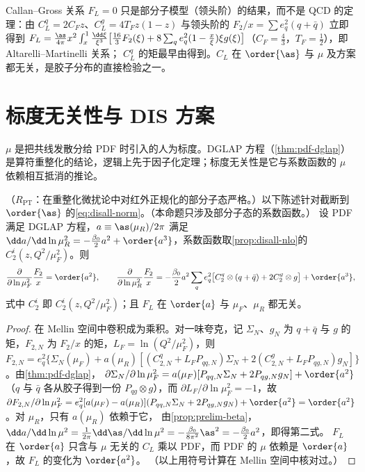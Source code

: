 \noindent
Callan--Gross 关系 $F_L=0$ 只是部分子模型（领头阶）的结果，而不是 QCD 的定理：由 $C_L^q=2C_Fz$、$C_L^g=4T_Fz(1-z)$ 与领头阶的 $F_2/x=\sum e_q^2(q+\bar q)$ 立即得到
$F_L=\frac{\as}{4\pi}x^2\int_x^1\frac{\dd\xi}{\xi^3}\big[\frac{16}3F_2(\xi)+8\sum_qe_q^2(1-\frac x\xi)\xi g(\xi)\big]$（$C_F=\frac43$，$T_F=\frac12$），即 Altarelli--Martinelli 关系\cite{AltarelliMartinelli1978}；
$C_L^q$ 的矩最早由\cite{Zee:1974du}得到。$C_L$ 在 $\order{\as}$ 与 $\mu$ 及方案都无关，是胶子分布的直接检验之一。
\section{标度无关性与 DIS 方案}\label{sec:disall-scale}

$\mu$ 是把共线发散分给 PDF 时引入的人为标度。DGLAP 方程（\cref{thm:pdf-dglap}）是算符重整化的结论，逻辑上先于因子化定理；标度无关性是它与系数函数的 $\mu$ 依赖相互抵消的推论。

\begin{proposition}\label{prop:disall-scale}
（$R_{\mathrm{PT}}$：在重整化微扰论中对红外正规化的部分子态严格。）以下陈述针对截断到 $\order{\as}$ 的\cref{eq:disall-norm}。（本命题只涉及部分子态的系数函数。）
设 PDF 满足 DGLAP 方程，$a\equiv\as(\mu_R)/2\pi$ 满足 $\dd a/\dd\ln\mu_R^2=-\frac{\beta_0}2a^2+\order{a^3}$，系数函数取\cref{prop:disall-nlo}的 $C_2^i(z,Q^2/\mu_F^2)$。则
\begin{equation}\label{eq:disall-scale}
\frac{\partial}{\partial\ln\mu_F^2}\frac{F_2}x=\order{a^2},\qquad
\frac{\partial}{\partial\ln\mu_R^2}\frac{F_2}x=-\frac{\beta_0}2a^2\sum_qe_q^2\big[C_2^q\otimes(q+\bar q)+2C_2^g\otimes g\big]+\order{a^3},   %
\end{equation}
式中 $C_2^i$ 即 $C_2^i(z,Q^2/\mu_F^2)$；且 $F_L$ 在 $\order{a}$ 与 $\mu_F$、$\mu_R$ 都无关。
\end{proposition}

\begin{proof}
在 Mellin 空间中卷积成为乘积。对一味夸克，记 $\Sigma_N$、$g_N$ 为 $q+\bar q$ 与 $g$ 的矩，$F_{2,N}$ 为 $F_2/x$ 的矩，$L_F=\ln(Q^2/\mu_F^2)$，则
$F_{2,N}=e_q^2\{\Sigma_N(\mu_F)+a(\mu_R)[(C^q_{2,N}+L_FP_{qq,N})\Sigma_N+2(C^g_{2,N}+L_FP_{qg,N})g_N]\}$。由\cref{thm:pdf-dglap}，
$\partial\Sigma_N/\partial\ln\mu_F^2=a(\mu_F)[P_{qq,N}\Sigma_N+2P_{qg,N}g_N]+\order{a^2}$（$q$ 与 $\bar q$ 各从胶子得到一份 $P_{qg}\otimes g$），而 $\partial L_F/\partial\ln\mu_F^2=-1$，故
$\partial F_{2,N}/\partial\ln\mu_F^2=e_q^2[a(\mu_F)-a(\mu_R)](P_{qq,N}\Sigma_N+2P_{qg,N}g_N)+\order{a^2}=\order{a^2}$。对 $\mu_R$，只有 $a(\mu_R)$ 依赖于它，
由\cref{prop:prelim-beta}，$\dd a/\dd\ln\mu^2=\frac1{2\pi}\dd\as/\dd\ln\mu^2=-\frac{\beta_0}{8\pi^2}\as^2=-\frac{\beta_0}2a^2$，即得第二式。
$F_L$ 在 $\order{a}$ 只含与 $\mu$ 无关的 $C_L$ 乘以 PDF，而 PDF 的 $\mu$ 依赖是 $\order{a}$，故 $F_L$ 的变化为 $\order{a^2}$。
（以上用符号计算在 Mellin 空间中核对过。）
\end{proof}

